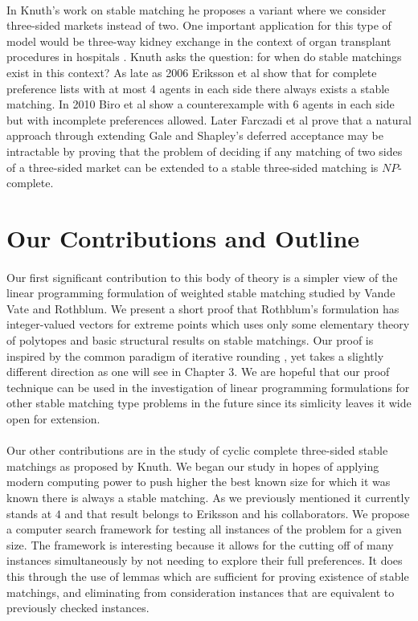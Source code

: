 \paragraph{}
In Knuth's work on stable matching he proposes a variant where we consider three-sided markets instead of two. One important application for this type of model would be three-way kidney exchange in the context of organ transplant procedures in hospitals \cite{saidman2006increasing}. Knuth asks the question: for when do stable matchings exist in this context? As late as 2006 Eriksson et al \cite{eriksson2006three} show that for complete preference lists with at most 4 agents in each side there always exists a stable matching. In 2010 Biro et al \cite{biro2010three} show a counterexample with 6 agents in each side but with incomplete preferences allowed. Later Farczadi et al \cite{farczadi2014stable} prove that a natural approach through extending Gale and Shapley's deferred acceptance may be intractable by proving that the problem of deciding if any matching of two sides of a three-sided market can be extended to a stable three-sided matching is $NP$-complete.

\section{Our Contributions and Outline}

\paragraph{}
Our first significant contribution to this body of theory is a simpler view of the linear programming formulation of weighted stable matching studied by Vande Vate and Rothblum. We present a short proof that Rothblum's formulation has integer-valued vectors for extreme points which uses only some elementary theory of polytopes and basic structural results on stable matchings. Our proof is inspired by the common paradigm of iterative rounding \cite{lau2011iterative}, yet takes a slightly different direction as one will see in Chapter $3$. We are hopeful that our proof technique can be used in the investigation of linear programming formulations for other stable matching type problems in the future since its simlicity leaves it wide open for extension.
\paragraph{}
Our other contributions are in the study of cyclic complete three-sided stable matchings as proposed by Knuth. We began our study in hopes of applying modern computing power to push higher the best known size for which it was known there is always a stable matching. As we previously mentioned it currently stands at $4$ and that result belongs to Eriksson and his collaborators. We propose a computer search framework for testing all instances of the problem for a given size. The framework is interesting because it allows for the cutting off of many instances simultaneously by not needing to explore their full preferences. It does this through the use of lemmas which are sufficient for proving existence of stable matchings, and eliminating from consideration instances that are equivalent to previously checked instances. 
